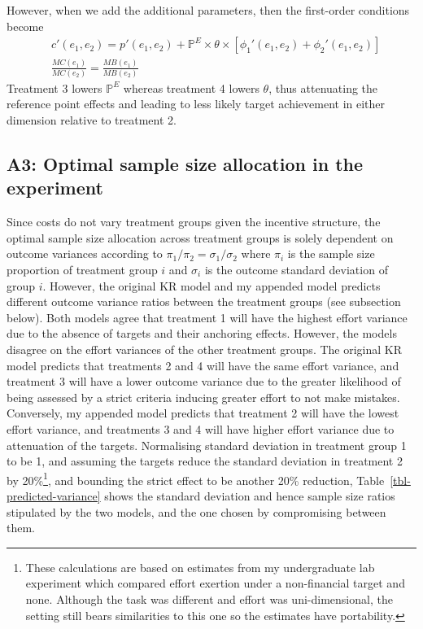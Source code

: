 \documentclass[
  12,
  letterpaper,
  DIV=11,
  numbers=noendperiod]{scrartcl}
\newcounter{none} %
\begin{document}
However, when we add the additional parameters, then the first-order
conditions become \[
\begin{aligned}
& c'(e_1, e_2) = p'(e_1, e_2) + \mathbb{P}^E \times \theta \times [\phi_1'(e_1, e_2) + \phi_2'(e_1, e_2)] \nonumber \\ 
& \frac {MC(e_1)}{MC(e_2)} = \frac {MB(e_1)}{MB(e_2)} \nonumber
\end{aligned}
\] Treatment 3 lowers \(\mathbb{P}^E\) whereas treatment 4 lowers
\(\theta\), thus attenuating the reference point effects and leading to
less likely target achievement in either dimension relative to treatment
2.

\subsection{A3: Optimal sample size allocation in the
experiment}\label{a3-optimal-sample-size-allocation-in-the-experiment}

Since costs do not vary treatment groups given the incentive structure,
the optimal sample size allocation across treatment groups is solely
dependent on outcome variances according to
\(\pi_1/\pi_2 = \sigma_1/\sigma_2\) where \(\pi_i\) is the sample size
proportion of treatment group \(i\) and \(\sigma_i\) is the outcome
standard deviation of group \(i\). However, the original KR model and my
appended model predicts different outcome variance ratios between the
treatment groups (see subsection below). Both models agree that
treatment 1 will have the highest effort variance due to the absence of
targets and their anchoring effects. However, the models disagree on the
effort variances of the other treatment groups. The original KR model
predicts that treatments 2 and 4 will have the same effort variance, and
treatment 3 will have a lower outcome variance due to the greater
likelihood of being assessed by a strict criteria inducing greater
effort to not make mistakes. Conversely, my appended model predicts that
treatment 2 will have the lowest effort variance, and treatments 3 and 4
will have higher effort variance due to attenuation of the targets.
Normalising standard deviation in treatment group 1 to be 1, and
assuming the targets reduce the standard deviation in treatment 2 by
20\%\footnote{These calculations are based on estimates from my
  undergraduate lab experiment which compared effort exertion under a
  non-financial target and none. Although the task was different and
  effort was uni-dimensional, the setting still bears similarities to
  this one so the estimates have portability.}, and bounding the strict
effect to be another 20\% reduction, Table~\ref{tbl-predicted-variance}
shows the standard deviation and hence sample size ratios stipulated by
the two models, and the one chosen by compromising between them.
\end{document}
